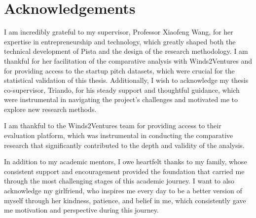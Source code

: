 \chapter*{Acknowledgements}

\label{ch:acknowledgements}

I am incredibly grateful to my supervisor, Professor Xiaofeng Wang, for her expertise in entrepreneurship and technology, which greatly shaped both the technical development of Pista and the design of the research methodology. I am thankful for her facilitation of the comparative analysis with Winds2Ventures and for providing access to the startup pitch datasets, which were crucial for the statistical validation of this thesis. Additionally, I wish to acknowledge my thesis co-supervisor, Triando, for his steady support and thoughtful guidance, which were instrumental in navigating the project's challenges and motivated me to explore new research methods.

I am thankful to the Winds2Ventures team for providing access to their evaluation platform, which was instrumental in conducting the comparative research that significantly contributed to the depth and validity of the analysis.

In addition to my academic mentors, I owe heartfelt thanks to my family, whose consistent support and encouragement provided the foundation that carried me through the most challenging stages of this academic journey. I want to also acknowledge my girlfriend, who inspires me every day to be a better version of myself through her kindness, patience, and belief in me, which consistently gave me motivation and perspective during this journey.
